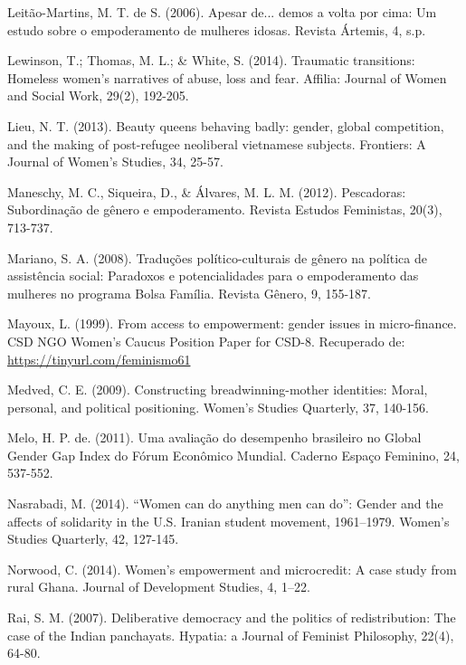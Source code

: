 \hangindent=25pt
\noindent Leitão-Martins, M. T. de S. (2006). Apesar de... demos a volta por cima: Um estudo sobre o empoderamento de mulheres idosas. Revista Ártemis, 4, s.p.

\hangindent=25pt
\noindent Lewinson, T.; Thomas, M. L.; \& White, S. (2014). Traumatic transitions: Homeless women’s narratives of abuse, loss and fear. Affilia: Journal of Women and Social Work, 29(2), 192-205.

\hangindent=25pt
\noindent Lieu, N. T. (2013). Beauty queens behaving badly: gender, global competition, and the making of post-refugee neoliberal vietnamese subjects. Frontiers: A Journal of Women’s Studies, 34, 25-57.

\hangindent=25pt
\noindent Maneschy, M. C., Siqueira, D., \& Álvares, M. L. M. (2012). Pescadoras: Subordinação de gênero e empoderamento. Revista Estudos Feministas, 20(3), 713-737.

\hangindent=25pt
\noindent Mariano, S. A. (2008). Traduções político-culturais de gênero na política de assistência social: Paradoxos e potencialidades para o empoderamento das mulheres no programa Bolsa Família. Revista Gênero, 9, 155-187.

\hangindent=25pt
\noindent Mayoux, L. (1999). From access to empowerment: gender issues in micro-finance. CSD NGO Women’s Caucus Position Paper for CSD-8. Recuperado de: \url{https://tinyurl.com/feminismo61}

\hangindent=25pt
\noindent Medved, C. E. (2009). Constructing breadwinning-mother identities: Moral, personal, and political positioning. Women’s Studies Quarterly, 37, 140-156.

\hangindent=25pt
\noindent Melo, H. P. de. (2011). Uma avaliação do desempenho brasileiro no Global Gender Gap Index do Fórum Econômico Mundial. Caderno Espaço Feminino, 24, 537-552.

\hangindent=25pt
\noindent Nasrabadi, M. (2014). ``Women can do anything men can do'': Gender and the affects of solidarity in the U.S. Iranian student movement, 1961–1979. Women’s Studies Quarterly, 42, 127-145.

\hangindent=25pt
\noindent Norwood, C. (2014). Women's empowerment and microcredit: A case study from rural Ghana. Journal of Development Studies, 4, 1–22.

\hangindent=25pt
\noindent Rai, S. M. (2007). Deliberative democracy and the politics of redistribution: The case of the Indian panchayats. Hypatia: a Journal of Feminist Philosophy, 22(4), 64-80.

